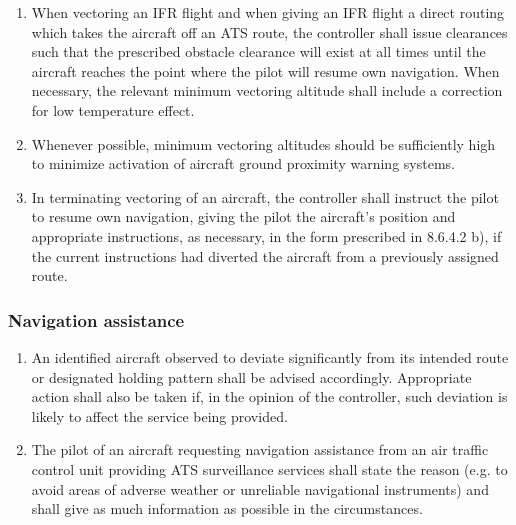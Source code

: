 \begin{enumerate}
    \item When vectoring an IFR flight and when giving an IFR flight a direct routing which takes the aircraft off an ATS route, the controller shall issue clearances such that the prescribed obstacle clearance will exist at all times until the aircraft reaches the point where the pilot will resume own navigation. When necessary, the relevant minimum vectoring altitude shall include a correction for low temperature effect.
    \item Whenever possible, minimum vectoring altitudes should be sufficiently high to minimize activation of aircraft ground proximity warning systems.
    \item In terminating vectoring of an aircraft, the controller shall instruct the pilot to resume own navigation, giving the pilot the aircraft’s position and appropriate instructions, as necessary, in the form prescribed in 8.6.4.2 b), if the current instructions had diverted the aircraft from a previously assigned route.
\end{enumerate}

\subsubsection{Navigation assistance}

\begin{enumerate}
    \item An identified aircraft observed to deviate significantly from its intended route or designated holding pattern shall be advised accordingly. Appropriate action shall also be taken if, in the opinion of the controller, such deviation is likely to affect the service being provided.
    \item The pilot of an aircraft requesting navigation assistance from an air traffic control unit providing ATS surveillance services shall state the reason (e.g. to avoid areas of adverse weather or unreliable navigational instruments) and shall give as much information as possible in the circumstances.
\end{enumerate}

